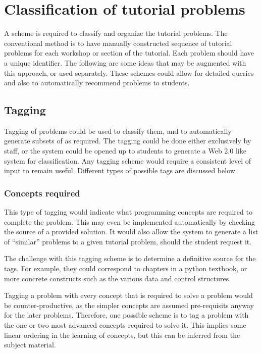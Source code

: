 \section{Classification of tutorial problems}
A scheme is required to classify and organize the tutorial problems. The conventional method is to have manually constructed sequence of tutorial problems for each workshop or section of the tutorial. Each problem should have a unique identifier. The following are some ideas that may be augmented with this approach, or used separately. These schemes could allow for detailed queries and also to automatically recommend problems to students.

\subsection{Tagging}
Tagging of problems could be used to classify them, and to automatically generate subsets of as required. The tagging could be done either exclusively by staff, or the system could be opened up to students to generate a Web 2.0 like system for classification. Any tagging scheme would require a consistent level of input to remain useful. Different types of possible tags are discussed below.

\subsubsection{Concepts required} \label{sec:concepts}
This type of tagging would indicate what programming concepts are required to complete the problem. This may even be implemented automatically by checking the source of a provided solution. It would also allow the system to generate a list of ``similar'' problems to a given tutorial problem, should the student request it.

The challenge with this tagging scheme is to determine a definitive source for the tags. For example, they could correspond to chapters in a python textbook, or more concrete constructs such as the various data and control structures.

Tagging a problem with every concept that is required to solve a problem would be counter-productive, as the simpler concepts are assumed pre-requisits anyway for the later problems. Therefore, one possible scheme is to tag a problem with the one or two most advanced concepts required to solve it. This implies some linear ordering in the learning of concepts, but this can be inferred from the subject material.

